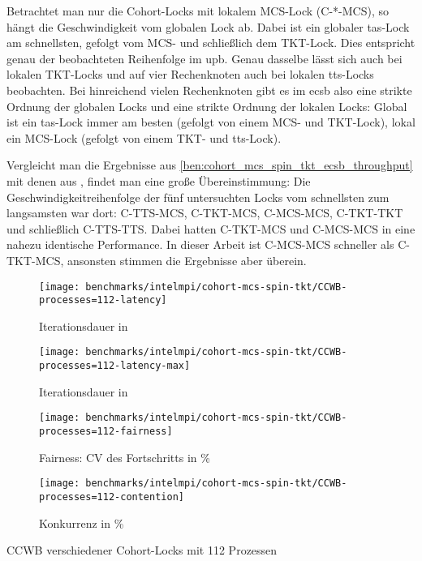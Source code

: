 Betrachtet man nur die Cohort-Locks mit lokalem MCS-Lock (C-*-MCS),
so hängt die Geschwindigkeit vom globalen Lock ab.
Dabei ist ein globaler \gls{tas}-Lock am schnellsten,
gefolgt vom MCS- und schließlich dem TKT-Lock.
Dies entspricht genau der beobachteten Reihenfolge im \gls{upb}.
Genau dasselbe lässt sich auch bei lokalen TKT-Locks
und auf vier Rechenknoten auch bei lokalen \gls{tts}-Locks beobachten.
Bei hinreichend vielen Rechenknoten gibt es im \gls{ecsb} also eine strikte Ordnung der globalen Locks
und eine strikte Ordnung der lokalen Locks:
Global ist ein \gls{tas}-Lock immer am besten (gefolgt von einem MCS- und TKT-Lock),
lokal ein MCS-Lock (gefolgt von einem TKT- und \gls{tts}-Lock).

Vergleicht man die Ergebnisse aus \autoref{ben:cohort_mcs_spin_tkt_ecsb_throughput} mit denen aus \cite{Cohort-Lock},
findet man eine große Übereinstimmung:
Die Geschwindigkeitreihenfolge der fünf untersuchten Locks vom schnellsten zum langsamsten war dort:
C-TTS-MCS, C-TKT-MCS, C-MCS-MCS, C-TKT-TKT und schließlich C-TTS-TTS.
Dabei hatten C-TKT-MCS und C-MCS-MCS in \cite{Cohort-Lock} eine nahezu identische Performance.
In dieser Arbeit ist C-MCS-MCS schneller als C-TKT-MCS,
ansonsten stimmen die Ergebnisse aber überein.

\begin{benchmark}[h]
    \begin{subfigure}{.5\textwidth}
        \texttt{[image: benchmarks/intelmpi/cohort-mcs-spin-tkt/CCWB-processes=112-latency]}
        \caption{Iterationsdauer in }
        \label{ben:cohort_mcs_spin_tkt_ccwb_112_latency}
    \end{subfigure}
    \begin{subfigure}{.5\textwidth}
        \texttt{[image: benchmarks/intelmpi/cohort-mcs-spin-tkt/CCWB-processes=112-latency-max]}
        \caption{Iterationsdauer in }
        \label{ben:cohort_mcs_spin_tkt_ccwb_112_latency_max}
    \end{subfigure}
    \begin{subfigure}{.5\textwidth}
        \texttt{[image: benchmarks/intelmpi/cohort-mcs-spin-tkt/CCWB-processes=112-fairness]}
        \caption{Fairness: CV des Fortschritts in \%}
        \label{ben:cohort_mcs_spin_tkt_ccwb_112_fairness}
    \end{subfigure}
    \begin{subfigure}{.5\textwidth}
        \texttt{[image: benchmarks/intelmpi/cohort-mcs-spin-tkt/CCWB-processes=112-contention]}
        \caption{Konkurrenz in \%}
        \label{ben:cohort_mcs_spin_tkt_ccwb_112_contention}
    \end{subfigure}
    \caption{CCWB verschiedener Cohort-Locks mit 112 Prozessen}
    \label{ben:cohort_mcs_spin_tkt_ccwb_112}
\end{benchmark}

